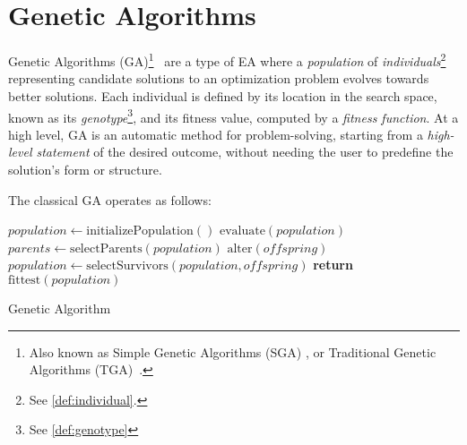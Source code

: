 \section{Genetic Algorithms}
\label{sec:bg:ga}
  Genetic Algorithms (GA)\footnote{
    Also known as Simple Genetic Algorithms (SGA) 
    \autocite{yuIntroductionEvolutionaryAlgorithms2010}, or Traditional 
    Genetic Algorithms (TGA)~\autocite{shiffmanNatureCode2012}.
  }~\autocite{hollandAdaptationNaturalArtificial1992a,kozaGeneticProgrammingProgramming1992a,yuIntroductionEvolutionaryAlgorithms2010,shiffmanNatureCode2012}
  are a type of EA where a \emph{population} of \emph{individuals}\footnote{
    See \vref{def:individual}.
  } representing candidate solutions to an optimization problem evolves towards better solutions.
  Each individual is defined by its location in the search space, known as its
  \emph{genotype}\footnote{See \vref{def:genotype}}, and its fitness value, computed by a \emph{fitness function}.
  At a high level, GA is an automatic method for problem-solving, starting from a 
  \textit{high-level statement} of the desired outcome, without needing the user to predefine
  the solution's form or structure.

  The classical GA operates as follows:

  \begin{algorithm}
    \begin{algorithmic}[1]
      \State \(\mathit{population} \gets \mathrm{initializePopulation()}\) 
      \State \(\mathrm{evaluate}(\mathit{population})\) 
      \Repeat
        \State \(\mathit{parents} \gets \mathrm{selectParents}(\mathit{population})\) 
        \State \(\mathrm{alter}(\mathit{offspring})\) 
        \State \(\mathit{population} \gets \mathrm{selectSurvivors}(\mathit{population},
          \mathit{offspring})\) 
       
      \State \textbf{return} \(\mathrm{fittest}(\mathit{population})\) 
    \end{algorithmic}
    \caption{Genetic Algorithm}
    \label{alg:genetic_algorithm}
  \end{algorithm}

